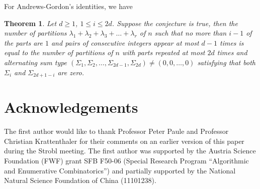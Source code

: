 \documentclass{amsart}
\newtheorem{theorem}{Theorem}
\begin{document}
For Andrews-Gordon's identities, we have 
\begin{theorem}
Let $d\geq 1$, $1\leq i\leq 2d$.
Suppose the conjecture is true, then the number of partitions $\lambda_{1}+\lambda_{2}+\lambda_{3}+\dots+\lambda_{r}$ of $n$ such that no more than $i-1$ of the parts are $1$ and pairs of consecutive integers appear at most $d-1$
 times is equal to the number of partitions of $n$ with parts repeated  at most $2d$ times and alternating sum type $(\Sigma_{1},\Sigma_{2},\dots,\Sigma_{2d-1},\Sigma_{2d})\neq(0,0,\dots,0)$ satisfying that both $\Sigma_{i}$ and $\Sigma_{2d+1-i}$ are zero.
\end{theorem}

\section*{Acknowledgements}
The first author would like to thank Professor Peter Paule and Professor Christian Krattenthaler for their  comments on an earlier version of this paper during the Strobl meeting. The first author was supported  by the Austria Science Foundation (FWF) grant SFB F50-06 (Special Research Program ``Algorithmic and Enumerative Combinatorics'') and partially supported by the National Natural Science Foundation of China (11101238).
\end{document}
